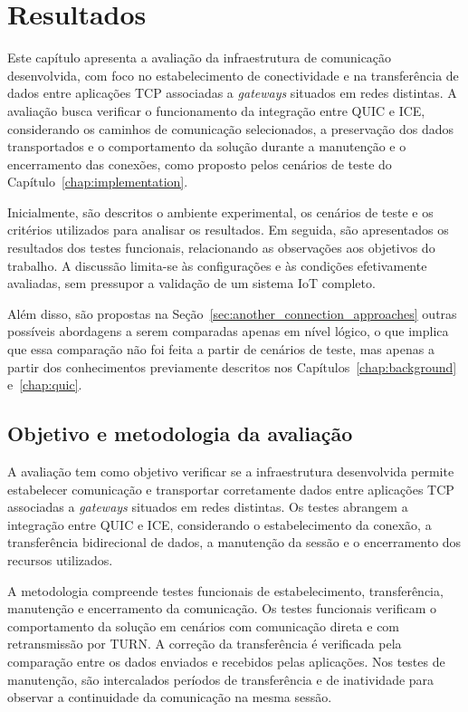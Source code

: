 \chapter{Resultados}
\label{chap:results}

Este capítulo apresenta a avaliação da infraestrutura de comunicação desenvolvida, com foco no estabelecimento de conectividade e na transferência de dados entre aplicações TCP associadas a \textit{gateways} situados em redes distintas. A avaliação busca verificar o funcionamento da integração entre QUIC e ICE, considerando os caminhos de comunicação selecionados, a preservação dos dados transportados e o comportamento da solução durante a manutenção e o encerramento das conexões, como proposto pelos cenários de teste do Capítulo~\ref{chap:implementation}.

Inicialmente, são descritos o ambiente experimental, os cenários de teste e os critérios utilizados para analisar os resultados. Em seguida, são apresentados os resultados dos testes funcionais, relacionando as observações aos objetivos do trabalho. A discussão limita-se às configurações e às condições efetivamente avaliadas, sem pressupor a validação de um sistema IoT completo.

Além disso, são propostas na Seção~\ref{sec:another_connection_approaches} outras possíveis abordagens a serem comparadas apenas em nível lógico, o que implica que essa comparação não foi feita a partir de cenários de teste, mas apenas a partir dos conhecimentos previamente descritos nos Capítulos~\ref{chap:background} e~\ref{chap:quic}.

\section{Objetivo e metodologia da avaliação}

A avaliação tem como objetivo verificar se a infraestrutura desenvolvida permite estabelecer comunicação e transportar corretamente dados entre aplicações TCP associadas a \textit{gateways} situados em redes distintas. Os testes abrangem a integração entre QUIC e ICE, considerando o estabelecimento da conexão, a transferência bidirecional de dados, a manutenção da sessão e o encerramento dos recursos utilizados.

A metodologia compreende testes funcionais de estabelecimento, transferência, manutenção e encerramento da comunicação. Os testes funcionais verificam o comportamento da solução em cenários com comunicação direta e com retransmissão por TURN. A correção da transferência é verificada pela comparação entre os dados enviados e recebidos pelas aplicações. Nos testes de manutenção, são intercalados períodos de transferência e de inatividade para observar a continuidade da comunicação na mesma sessão.

